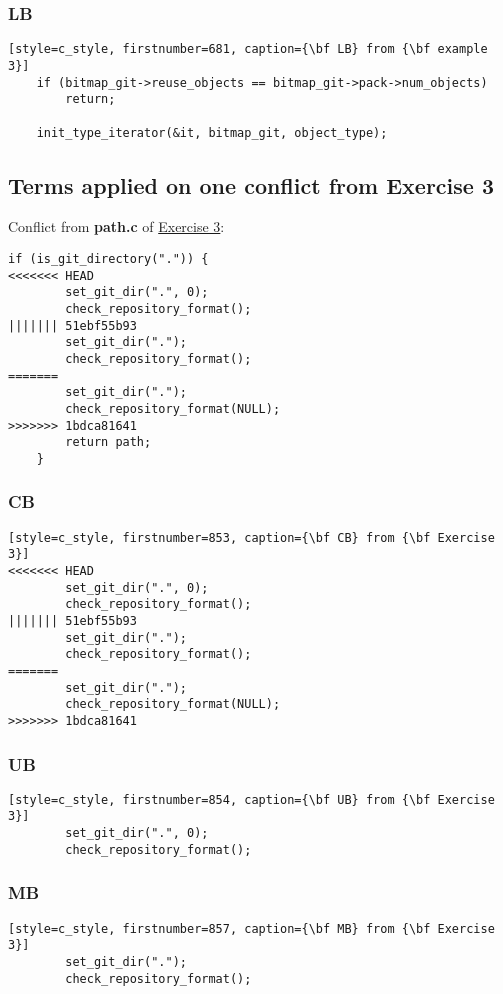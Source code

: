 \subsubsection*{LB}
\begin{lstlisting}[style=c_style, firstnumber=681, caption={\bf LB} from {\bf example 3}]
	if (bitmap_git->reuse_objects == bitmap_git->pack->num_objects)
		return;

	init_type_iterator(&it, bitmap_git, object_type);
\end{lstlisting}

\subsection{Terms applied on one conflict from Exercise 3}
Conflict from {\bf path.c} of \hyperref[exercise_03]{Exercise 3}:

\begin{lstlisting}[style=c_style, firstnumber=852, caption=Conflict on {\bf path.c} from {\bf Exercise 3}]
	if (is_git_directory(".")) {
<<<<<<< HEAD
		set_git_dir(".", 0);
		check_repository_format();
||||||| 51ebf55b93
		set_git_dir(".");
		check_repository_format();
=======
		set_git_dir(".");
		check_repository_format(NULL);
>>>>>>> 1bdca81641
		return path;
	}
\end{lstlisting}


\subsubsection*{CB}
\begin{lstlisting}[style=c_style, firstnumber=853, caption={\bf CB} from {\bf Exercise 3}]
<<<<<<< HEAD
		set_git_dir(".", 0);
		check_repository_format();
||||||| 51ebf55b93
		set_git_dir(".");
		check_repository_format();
=======
		set_git_dir(".");
		check_repository_format(NULL);
>>>>>>> 1bdca81641
\end{lstlisting}


\subsubsection*{UB}
\begin{lstlisting}[style=c_style, firstnumber=854, caption={\bf UB} from {\bf Exercise 3}]
		set_git_dir(".", 0);
		check_repository_format();
\end{lstlisting}

\subsubsection*{MB}
\begin{lstlisting}[style=c_style, firstnumber=857, caption={\bf MB} from {\bf Exercise 3}]
		set_git_dir(".");
		check_repository_format();
\end{lstlisting}


